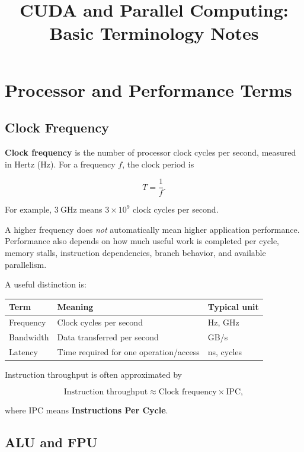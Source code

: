 \documentclass[11pt,a4paper]{article}
\title{CUDA and Parallel Computing: Basic Terminology Notes}
\author{}
\date{}
\begin{document}
\maketitle
\tableofcontents
\newpage

\section{Processor and Performance Terms}

\subsection{Clock Frequency}

\textbf{Clock frequency} is the number of processor clock cycles per second, measured in Hertz (Hz). For a frequency \(f\), the clock period is

\[
T=\frac{1}{f}.
\]

For example, \(3~\mathrm{GHz}\) means \(3\times10^9\) clock cycles per second.

A higher frequency does \emph{not} automatically mean higher application performance. Performance also depends on how much useful work is completed per cycle, memory stalls, instruction dependencies, branch behavior, and available parallelism.

A useful distinction is:

\begin{center}
\begin{tabular}{lll}
\toprule
Term & Meaning & Typical unit \\
\midrule
Frequency & Clock cycles per second & Hz, GHz \\
Bandwidth & Data transferred per second & GB/s \\
Latency & Time required for one operation/access & ns, cycles \\
\bottomrule
\end{tabular}
\end{center}

Instruction throughput is often approximated by

\[
\text{Instruction throughput}
\approx
\text{Clock frequency}\times\text{IPC},
\]

where IPC means \textbf{Instructions Per Cycle}.

\subsection{ALU and FPU}
\end{document}
